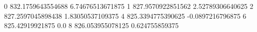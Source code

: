 0 832.1759643554688 6.74676513671875
1 827.9570922851562 2.52789306640625
2 827.2597045898438 1.83050537109375
4 825.3394775390625 -0.0897216796875
6 825.42919921875 0.0
8 826.053955078125 0.624755859375
